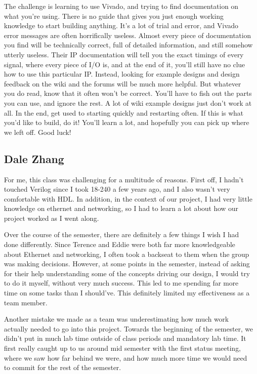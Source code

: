 \documentclass[12pt]{report}
\begin{document}
The challenge is learning to use Vivado, and trying to find documentation on what you're using. There is no guide that gives you just enough working knowledge to start building anything. It's a lot of trial and error, and Vivado error messages are often horrifically useless.
Almost every piece of documentation you find will be technically correct, full of detailed information, and still somehow utterly useless.
Their IP documentation will tell you the exact timings of every signal, where every piece of I/O is, and at the end of it, you'll still have no clue how to use this particular IP. Instead, looking for example designs and design feedback on the wiki and the forums will be much more helpful. But whatever you do read, know that it often won't be correct. You'll have to fish out the parts you can use, and ignore the rest. A lot of wiki example designs just don't work at all. In the end, get used to starting quickly and restarting often. If this is what you'd like to build, do it! You'll learn a lot, and hopefully you can pick up where we left off. Good luck!

\subsection{Dale Zhang}
For me, this class was challenging for a multitude of reasons. First off, I hadn't touched Verilog since I took 18-240 a few years ago, and I also wasn't very comfortable with HDL. In addition, in the context of our project, I had very little knowledge on ethernet and networking, so I had to learn a lot about how our project worked as I went along.

Over the course of the semester, there are definitely a few things I wish I had done differently. Since Terence and Eddie were both far more knowledgeable about Ethernet and networking, I often took a backseat to them when the group was making decisions. However, at some points in the semester, instead of asking for their help understanding some of the concepts driving our design, I would try to do it myself, without very much success. This led to me spending far more time on some tasks than I should've. This definitely limited my effectiveness as a team member.

Another mistake we made as a team was underestimating how much work actually needed to go into this project. Towards the beginning of the semester, we didn't put in much lab time outside of class periods and mandatory lab time. It first really caught up to us around mid semester with the first status meeting, where we saw how far behind we were, and how much more time we would need to commit for the rest of the semester.
\end{document}
